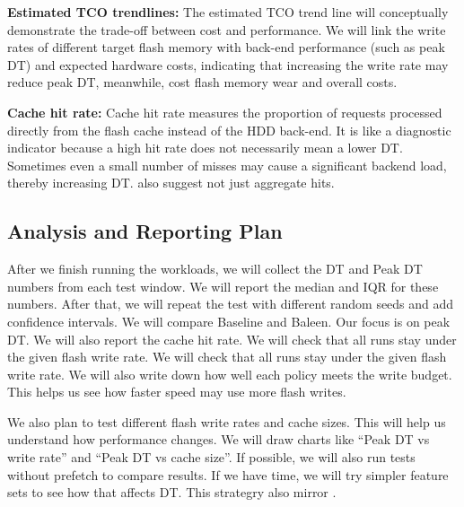 \textbf{Estimated TCO trendlines:}
The estimated TCO trend line will conceptually demonstrate the trade-off between cost and performance. We will link the write rates of different target flash memory with back-end performance (such as peak DT) and expected hardware costs, indicating that increasing the write rate may reduce peak DT, meanwhile, cost flash memory wear and overall costs.

\textbf{Cache hit rate:}
Cache hit rate measures the proportion of requests processed directly from the flash cache instead of the HDD back-end. It is like a diagnostic indicator because a high hit rate does not necessarily mean a lower DT. Sometimes even a small number of misses may cause a significant backend load, thereby increasing DT. \cite{beckmann2018lhd} also suggest not just aggregate hits.


\subsection{Analysis and Reporting Plan}

After we finish running the workloads, we will collect the DT and Peak DT numbers from each test window. We will report the median and IQR for these numbers. After that, we will repeat the test with different random seeds and add confidence intervals. We will compare Baseline and Baleen. Our focus is on peak DT. We will also report the cache hit rate. We will check that all runs stay under the given flash write rate. We will check that all runs stay under the given flash write rate. We will also write down how well each policy meets the write budget. This helps us see how faster speed may use more flash writes.

We also plan to test different flash write rates and cache sizes. This will help us understand how performance changes. We will draw charts like “Peak DT vs write rate” and “Peak DT vs cache size”. If possible, we will also run tests without prefetch to compare results. If we have time, we will try simpler feature sets to see how that affects DT. This strategry also mirror \cite{berg2020cachelib}.

